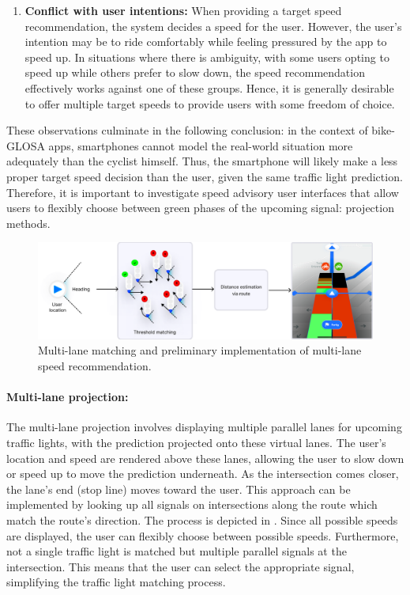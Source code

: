 \begin{enumerate}
\item \textbf{Conflict with user intentions:} When providing a target speed recommendation, the system decides a speed for the user. However, the user's intention may be to ride comfortably while feeling pressured by the app to speed up. In situations where there is ambiguity, with some users opting to speed up while others prefer to slow down, the speed recommendation effectively works against one of these groups. Hence, it is generally desirable to offer multiple target speeds to provide users with some freedom of choice.
\end{enumerate}
 
These observations culminate in the following conclusion: in the context of bike-GLOSA apps, smartphones cannot model the real-world situation more adequately than the cyclist himself. Thus, the smartphone will likely make a less proper target speed decision than the user, given the same traffic light prediction. Therefore, it is important to investigate speed advisory user interfaces that allow users to flexibly choose between green phases of the upcoming signal: projection methods.

\begin{figure}[htbp]
\centering
\includegraphics[width=\linewidth]{images/multi-lane-view.png}
\caption{Multi-lane matching and preliminary implementation of multi-lane speed recommendation.}
\label{fig:multi-lane-view}
\end{figure}

\paragraph{Multi-lane projection:} The multi-lane projection involves displaying multiple parallel lanes for upcoming traffic lights, with the prediction projected onto these virtual lanes. The user's location and speed are rendered above these lanes, allowing the user to slow down or speed up to move the prediction underneath. As the intersection comes closer, the lane's end (stop line) moves toward the user. This approach can be implemented by looking up all signals on intersections along the route which match the route's direction. The process is depicted in . Since all possible speeds are displayed, the user can flexibly choose between possible speeds. Furthermore, not a single traffic light is matched but multiple parallel signals at the intersection. This means that the user can select the appropriate signal, simplifying the traffic light matching process.

